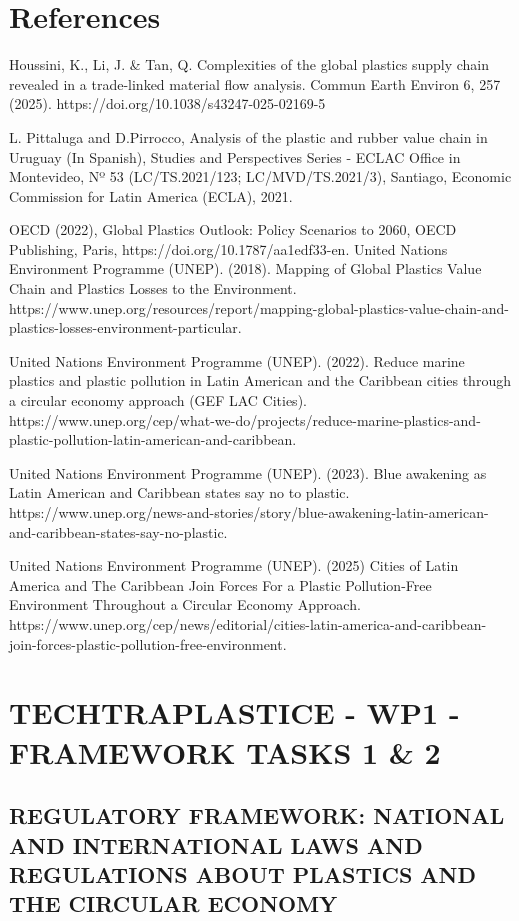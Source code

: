\documentclass[
  12pt,
  oneside]{book}
\begin{document}
\chapter{References}\label{references}

Houssini, K., Li, J. \& Tan, Q. Complexities of the global plastics
supply chain revealed in a trade-linked material flow analysis. Commun
Earth Environ 6, 257 (2025). https://doi.org/10.1038/s43247-025-02169-5

L. Pittaluga and D.Pirrocco, Analysis of the plastic and rubber value
chain in Uruguay (In Spanish), Studies and Perspectives Series - ECLAC
Office in Montevideo, Nº 53 (LC/TS.2021/123; LC/MVD/TS.2021/3),
Santiago, Economic Commission for Latin America (ECLA), 2021.

OECD (2022), Global Plastics Outlook: Policy Scenarios to 2060, OECD
Publishing, Paris, https://doi.org/10.1787/aa1edf33-en. United Nations
Environment Programme (UNEP). (2018). Mapping of Global Plastics Value
Chain and Plastics Losses to the Environment.
https://www.unep.org/resources/report/mapping-global-plastics-value-chain-and-plastics-losses-environment-particular.

United Nations Environment Programme (UNEP). (2022). Reduce marine
plastics and plastic pollution in Latin American and the Caribbean
cities through a circular economy approach (GEF LAC Cities).
https://www.unep.org/cep/what-we-do/projects/reduce-marine-plastics-and-plastic-pollution-latin-american-and-caribbean.

United Nations Environment Programme (UNEP). (2023). Blue awakening as
Latin American and Caribbean states say no to plastic.
https://www.unep.org/news-and-stories/story/blue-awakening-latin-american-and-caribbean-states-say-no-plastic.

United Nations Environment Programme (UNEP). (2025) Cities of Latin
America and The Caribbean Join Forces For a Plastic Pollution-Free
Environment Throughout a Circular Economy Approach.
https://www.unep.org/cep/news/editorial/cities-latin-america-and-caribbean-join-forces-plastic-pollution-free-environment.

\appendix

\chapter{TECHTRAPLASTICE - WP1 - FRAMEWORK TASKS 1 \&
2}\label{sec-protocol}

\section{REGULATORY FRAMEWORK: NATIONAL AND INTERNATIONAL LAWS AND
REGULATIONS ABOUT PLASTICS AND THE CIRCULAR
ECONOMY}\label{regulatory-framework-national-and-international-laws-and-regulations-about-plastics-and-the-circular-economy}
\end{document}
